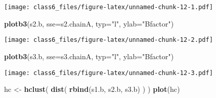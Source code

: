 \documentclass[]{article}
\newenvironment{Shaded}{\begin{snugshade}}{\end{snugshade}}
\newcommand{\KeywordTok}[1]{\textcolor[rgb]{0.13,0.29,0.53}{\textbf{#1}}}
\newcommand{\DataTypeTok}[1]{\textcolor[rgb]{0.13,0.29,0.53}{#1}}
\newcommand{\StringTok}[1]{\textcolor[rgb]{0.31,0.60,0.02}{#1}}
\newcommand{\OperatorTok}[1]{\textcolor[rgb]{0.81,0.36,0.00}{\textbf{#1}}}
\newcommand{\NormalTok}[1]{#1}
\begin{document}
\begin{Shaded}
\end{Shaded}

\texttt{[image: class6\_files/figure-latex/unnamed-chunk-12-1.pdf]}

\begin{Shaded}
\begin{Highlighting}[]
\KeywordTok{plotb3}\NormalTok{(s2.b, }\DataTypeTok{sse=}\NormalTok{s2.chainA, }\DataTypeTok{typ=}\StringTok{"l"}\NormalTok{, }\DataTypeTok{ylab=}\StringTok{"Bfactor"}\NormalTok{)}
\end{Highlighting}
\end{Shaded}

\texttt{[image: class6\_files/figure-latex/unnamed-chunk-12-2.pdf]}

\begin{Shaded}
\begin{Highlighting}[]
\KeywordTok{plotb3}\NormalTok{(s3.b, }\DataTypeTok{sse=}\NormalTok{s3.chainA, }\DataTypeTok{typ=}\StringTok{"l"}\NormalTok{, }\DataTypeTok{ylab=}\StringTok{"Bfactor"}\NormalTok{)}
\end{Highlighting}
\end{Shaded}

\texttt{[image: class6\_files/figure-latex/unnamed-chunk-12-3.pdf]}

\begin{Shaded}
\begin{Highlighting}[]
\NormalTok{hc <-}\StringTok{ }\KeywordTok{hclust}\NormalTok{( }\KeywordTok{dist}\NormalTok{( }\KeywordTok{rbind}\NormalTok{(s1.b, s2.b, s3.b) ) )}
\KeywordTok{plot}\NormalTok{(hc)}
\end{Highlighting}
\end{Shaded}
\end{document}
